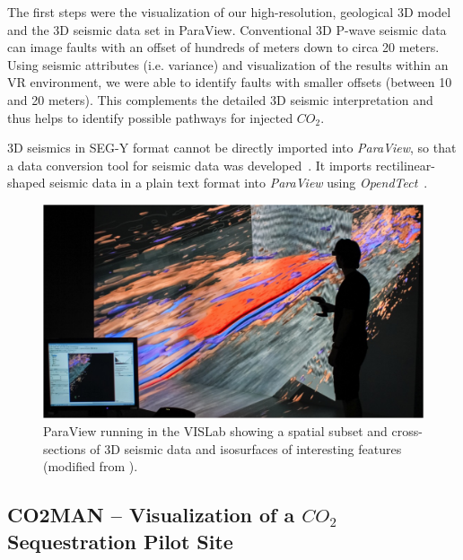 \documentclass[twocolumn]{svjour3}          %
\begin{document}
The first steps were the visualization of our high-resolution, geological 3D model and the 3D seismic data set in ParaView. Conventional 3D P-wave seismic data can image faults with an offset of hundreds of meters down to circa 20 meters. Using seismic attributes (i.e. variance) and visualization of the results within an VR environment, we were able to identify faults with smaller offsets (between 10 and 20 meters). This complements the detailed 3D seismic interpretation and thus helps to identify possible pathways for injected $CO_{2}$.

3D seismics in SEG-Y format cannot be directly imported into \emph{ParaView}, so that a data conversion tool for seismic data was developed~\cite{bilke:simpleseismicreader}. It imports rectilinear-shaped seismic data in a plain text format into \emph{ParaView} using \emph{OpendTect}~\cite{web:opendtect}.

\begin{figure}[htb]
  \includegraphics[width=\linewidth]{images/seismic.jpg}
\caption{ParaView running in the VISLab showing a spatial subset and cross-sections of 3D seismic data and isosurfaces of interesting features (modified from \cite{krawczyk:deformation}).}
\label{fig:seismic}
\end{figure}


\subsection{CO2MAN -- Visualization of a  $CO_{2}$ Sequestration Pilot Site}
\label{co2man}
\end{document}
